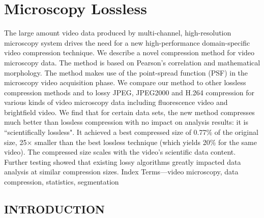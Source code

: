\chapter{Microscopy Lossless}
The large amount video data produced by multi-channel, high-resolution microscopy system drives the need for a new high-performance domain-specific video compression technique. We describe a novel compression method for video microscopy data. The method is based on Pearson's correlation and mathematical morphology. The method makes use of the point-spread function (PSF) in the microscopy video acquisition phase. We compare our method to other lossless compression methods and to lossy JPEG, JPEG2000 and H.264 compression for various kinds of video microscopy data including fluorescence video and brightfield video. We find that for certain data sets, the new method compresses much better than lossless compression with no impact on analysis results: it is ``scientifically lossless".  It achieved a best compressed size of 0.77\% of the original size, 25× smaller than the best lossless technique (which yields 20\% for the same video).  The compressed size scales with the video's scientific data content.  Further testing showed that existing lossy algorithms greatly impacted data analysis at similar compression sizes.
Index Terms—video microscopy, data compression, statistics, segmentation

\section{INTRODUCTION}

